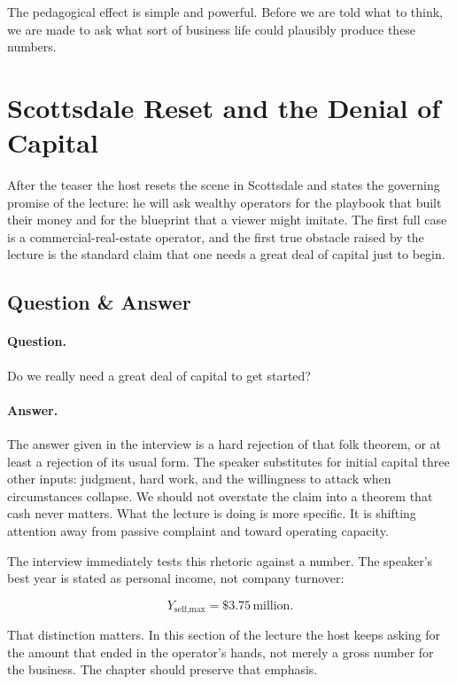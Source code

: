 The pedagogical effect is simple and powerful. Before we are told what to think, we are made to ask what sort of business life could plausibly produce these numbers.

\section{Scottsdale Reset and the Denial of Capital}

After the teaser the host resets the scene in Scottsdale and states the governing promise of the lecture: he will ask wealthy operators for the playbook that built their money and for the blueprint that a viewer might imitate. The first full case is a commercial-real-estate operator, and the first true obstacle raised by the lecture is the standard claim that one needs a great deal of capital just to begin.

\subsection{Question \& Answer}

\paragraph{Question.} Do we really need a great deal of capital to get started?

\paragraph{Answer.} The answer given in the interview is a hard rejection of that folk theorem, or at least a rejection of its usual form. The speaker substitutes for initial capital three other inputs: judgment, hard work, and the willingness to attack when circumstances collapse. We should not overstate the claim into a theorem that cash never matters. What the lecture is doing is more specific. It is shifting attention away from passive complaint and toward operating capacity.

The interview immediately tests this rhetoric against a number. The speaker's best year is stated as personal income, not company turnover:

\begin{equation}
Y_{\text{self,max}}=\$3.75\,\text{million}.
\end{equation}

That distinction matters. In this section of the lecture the host keeps asking for the amount that ended in the operator's hands, not merely a gross number for the business. The chapter should preserve that emphasis.

